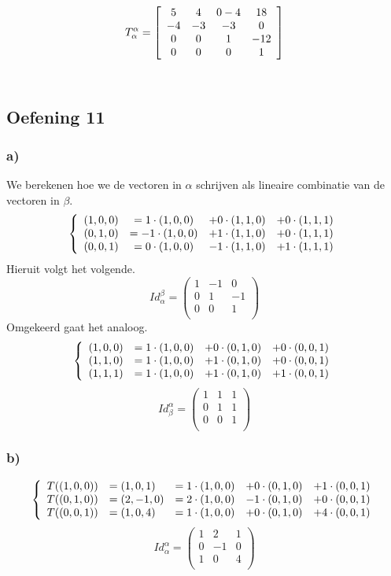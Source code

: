 \documentclass[lineaire_algebra_oplossingen.tex]{subfiles}
\begin{document}
\[
T^{\alpha}_{\alpha} =
\left[
\begin{array}{c c c c}
5 & 4 & 0-4 & 18\\
-4 & -3 & -3 & 0\\
0 & 0 & 1 & -12\\
0 & 0 & 0 & 1
\end{array}
\right]
\]\\

\subsection{Oefening 11}
\subsubsection*{a)}
We berekenen hoe we de vectoren in $\alpha$ schrijven als lineaire combinatie van de vectoren in $\beta$.
\[
\left\lbrace
\begin{array}{c c c c}
(1,0,0) &= 1\cdot (1,0,0) &+ 0\cdot (1,1,0) &+ 0\cdot (1,1,1)\\
(0,1,0) &= -1\cdot(1,0,0) &+ 1\cdot (1,1,0) &+ 0\cdot (1,1,1)\\
(0,0,1) &= 0\cdot(1,0,0) &-1\cdot (1,1,0) &+ 1\cdot (1,1,1)
\end{array}
\right.
\]
Hieruit volgt het volgende.
\[
Id_\alpha^\beta = 
\begin{pmatrix}
1 & -1 & 0\\
0 & 1 & -1\\
0 & 0 & 1\\
\end{pmatrix}
\]
Omgekeerd gaat het analoog.
\[
\left\lbrace
\begin{array}{c c c c}
(1,0,0) &= 1\cdot (1,0,0) &+ 0\cdot (0,1,0) &+ 0\cdot (0,0,1)\\
(1,1,0) &= 1\cdot (1,0,0) &+ 1\cdot (0,1,0) &+ 0\cdot (0,0,1)\\
(1,1,1) &= 1\cdot (1,0,0) &+ 1\cdot (0,1,0) &+ 1\cdot (0,0,1)
\end{array}
\right.
\]
\[
Id_\beta^\alpha = 
\begin{pmatrix}
1 & 1 & 1\\
0 & 1 & 1\\
0 & 0 & 1\\
\end{pmatrix}
\]
\subsubsection*{b)}
\[
\left\lbrace
\begin{array}{c l c c c}
T((1,0,0)) &= (1,0,1) &= 1\cdot (1,0,0) &+ 0\cdot (0,1,0) &+ 1\cdot (0,0,1) \\
T((0,1,0)) &= (2,-1,0)&= 2\cdot (1,0,0) &- 1\cdot (0,1,0) &+ 0\cdot (0,0,1)\\
T((0,0,1)) &= (1,0,4) &= 1\cdot (1,0,0) &+ 0\cdot (0,1,0) &+ 4\cdot (0,0,1)\\ 
\end{array}
\right.
\]
\[
Id_\alpha^\alpha = 
\begin{pmatrix}
1 & 2 & 1\\
0 & -1 & 0\\
1 & 0 & 4\\
\end{pmatrix}
\]
\end{document}
